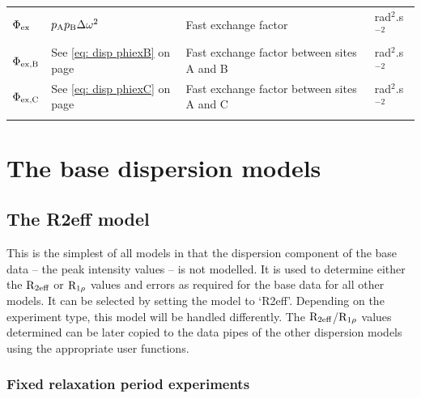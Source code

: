 \begin{table}
\begin{center}
\begin{longtable}{llll}
$\Phi_\textrm{ex}$           & $p_\textrm{A}p_\textrm{B}\Delta\omega^2$                  & Fast exchange factor                                                          & rad$^2$.s$^{-2}$ \\
$\Phi_\textrm{ex,B}$          & See \ref{eq: disp phiexB} on page \pageref{eq: disp phiexB} & Fast exchange factor between sites A and B       & rad$^2$.s$^{-2}$ \\
$\Phi_\textrm{ex,C}$          & See \ref{eq: disp phiexC} on page \pageref{eq: disp phiexC} & Fast exchange factor between sites A and C       & rad$^2$.s$^{-2}$ \\
\bottomrule
\label{table: dispersion parameters}
\end{longtable}
\end{center}
\end{table}




\clearpage

\section{The base dispersion models}
\label{sect: dispersion: base models}



\subsection{The R2eff model}
\label{sect: dispersion: R2eff model}

This is the simplest of all models in that the dispersion component of the base data -- the peak intensity values -- is not modelled.  It is used to determine either the $\mathrm{R}_{2\textrm{eff}}$ or $\mathrm{R}_{1\rho}$ values and errors as required for the base data for all other models.  It can be selected by setting the model to `R2eff'.  Depending on the experiment type, this model will be handled differently.  The $\mathrm{R}_{2\textrm{eff}}$/$\mathrm{R}_{1\rho}$ values determined can be later copied to the data pipes of the other dispersion models using the appropriate user functions.


\subsubsection{Fixed relaxation period experiments}

